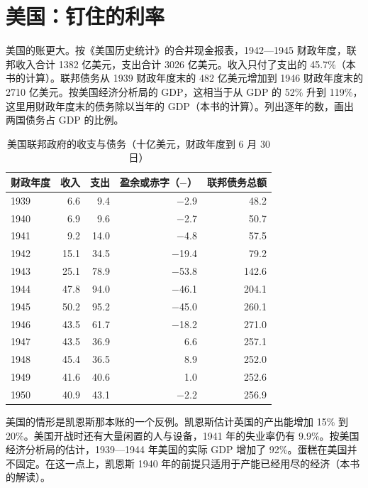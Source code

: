 \section{美国：钉住的利率}\label{sec:warfinance-us}

美国的账更大。按《美国历史统计》的合并现金报表，1942—1945 财政年度，联邦收入合计 1382 亿美元，支出合计 3026 亿美元\cite{census1975y34}。收入只付了支出的 45.7\%（本书的计算）。联邦债务从 1939 财政年度末的 482 亿美元增加到 1946 财政年度末的 2710 亿美元\cite{census1975y34}。按美国经济分析局的 GDP，这相当于从 GDP 的 52\% 升到 119\%，这里用财政年度末的债务除以当年的 GDP（本书的计算）\cite{bea2026}。列出逐年的数，画出两国债务占 GDP 的比例。

\begin{table}[tbp]
\centering\small
\caption{美国联邦政府的收支与债务（十亿美元，财政年度到 6 月 30 日）}\label{tab:warfinance-us}
\begin{tabularx}{\linewidth}{@{}X r r r r@{}}
\toprule
财政年度 & 收入 & 支出 & 盈余或赤字（$-$） & 联邦债务总额 \\
\midrule
1939 & 6.6 & 9.4 & $-$2.9 & 48.2 \\
1940 & 6.9 & 9.6 & $-$2.7 & 50.7 \\
1941 & 9.2 & 14.0 & $-$4.8 & 57.5 \\
1942 & 15.1 & 34.5 & $-$19.4 & 79.2 \\
1943 & 25.1 & 78.9 & $-$53.8 & 142.6 \\
1944 & 47.8 & 94.0 & $-$46.1 & 204.1 \\
1945 & 50.2 & 95.2 & $-$45.0 & 260.1 \\
1946 & 43.5 & 61.7 & $-$18.2 & 271.0 \\
1947 & 43.5 & 36.9 & 6.6 & 257.1 \\
1948 & 45.4 & 36.5 & 8.9 & 252.0 \\
1949 & 41.6 & 40.6 & 1.0 & 252.6 \\
1950 & 40.9 & 43.1 & $-$2.2 & 256.9 \\
\bottomrule
\end{tabularx}
\end{table}

美国的情形是凯恩斯那本账的一个反例。凯恩斯估计英国的产出能增加 15\% 到 20\%\cite{keynes1940}。美国开战时还有大量闲置的人与设备，1941 年的失业率仍有 9.9\%\cite{census1975a}。按美国经济分析局的估计，1939—1944 年美国的实际 GDP 增加了 92\%\cite{bea2026}。蛋糕在美国并不固定。在这一点上，凯恩斯 1940 年的前提只适用于产能已经用尽的经济（本书的解读）。

